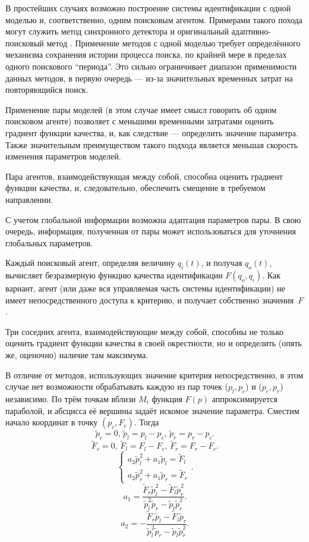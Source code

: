 В простейших случаях возможно построение системы идентификации
с одной моделью и, соответственно, одним поисковым агентом.
Примерами такого похода могут служить
метод синхронного детектора \cite{adopt_cont_sys}
и оригинальный адаптивно-поисковый метод \cite{mich_92}.
Применение методов с одной моделью требует определённого механизма
сохранения истории процесса поиска, по крайней мере в пределах
одного поискового ``периода''. Это сильно ограничивает диапазон
применимости данных методов, в первую очередь --- из-за значительных
временных затрат на повторяющийся поиск.

Применение пары моделей \cite{atu_asau3} %
(в этом случае имеет смысл говорить об одном поисковом агенте)
позволяет с меньшими временными затратами оценить градиент функции качества,
и, как следствие --- определить значение параметра. Также значительным преимуществом
такого подхода является меньшая скорость изменения параметров моделей.


Пара агентов, взаимодействующая между собой,
способна оценить градиент функции качества,
и, следовательно, обеспечить смещение в требуемом направлении.

С учетом глобальной информации возможна адаптация параметров пары.
В свою очередь, информация, полученная от пары может
использоваться для уточнения глобальных параметров.



Каждый поисковый агент, определяя величину $q_{i}(t)$, и получая $q_o(t)$,
вычисляет безразмерную функцию качества идентификации
$F(q_o,q_i)$. Как вариант, агент (или даже вся управляемая часть системы идентификации)
не имеет непосредственного доступа к критерию,
и получает собственно значения~$F$.




Три соседних агента, взаимодействующие между собой,
способны не только оценить градиент функции качества в своей окрестности,
но и определить (опять же, оценочно) наличие там максимума.

В отличие от методов, использующих значение критерия непосредственно,
в этом случае нет возможности обрабатывать
каждую из пар точек ($p_l,p_c$) и ($p_c,p_r$) независимо.
По трём точкам вблизи  $M_{i}$
функция $F(p)$ аппроксимируется параболой, и абсцисса её вершины задаёт искомое
значение параметра. Сместим начало координат в точку
$ ( p_c, F_c ) $. Тогда
%
\[
  \tilde{p}_c = 0, \,
  \tilde{p}_l = p_l - p_c, \,
  \tilde{p}_r = p_r - p_c.
\]
%
\[
  \tilde{F}_c = 0, \,
  \tilde{F}_l = F_l - F_c, \,
  \tilde{F}_r = F_r - F_c.
\]
%
\[
  \left\{
    \begin{array}{l}
      a_2 \tilde{p}_l^2 + a_1 \tilde{p}_l  = \tilde{F}_l
      \\
      a_2 \tilde{p}_r^2 + a_1 \tilde{p}_r  = \tilde{F}_r
    \end{array}
  \right. .
\]
%
\[
  a_1 = \frac{\tilde{F}_r \tilde{p}_l^2 - \tilde{F}_l \tilde{p}_r^2 }
             { \tilde{p}_l^2 \tilde{p}_r  - \tilde{p}_l \tilde{p}_r^2 }.
\]
%
\[
  a_2 = - \frac{\tilde{F}_r \tilde{p}_l - \tilde{F}_l \tilde{p}_r }
               { \tilde{p}_l^2 \tilde{p}_r  - \tilde{p}_l \tilde{p}_r^2 }.
\]

